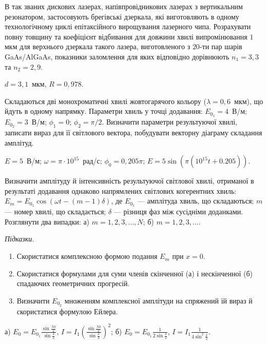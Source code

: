 \begin{problem}%
    В так званих дискових лазерах, напівпровідникових лазерах з вертикальним резонатором, застосовують брегівські дзеркала, які виготовляють в одному технологічному циклі епітаксійного вирощування лазерного чипа. Розрахувати повну товщину та коефіцієнт відбивання для довжини хвилі випромінювання $ 1 $ мкм для верхнього дзеркала такого лазера, виготовленого з $ 20 $-ти пар шарів GaAs/AlGaAs, показники заломлення для яких відповідно дорівнюють $ n_1= 3,3 $  та $ n_2=2,9 $.
\begin{solution}
    $ d =  3,1$~мкм, $ R=0,978 $.
\end{solution}
\end{problem}



\begin{problem}%
Складаються дві монохроматичні хвилі жовтогарячого кольору ($\lambda =
	0,6$~мкм), що йдуть в одному напрямку. Параметри хвиль у точці
додавання: $E_{0_1} = 4$~В/м; $E_{0_2} = 3$~В/м; $\phi_1 = 0$; $\phi_2 = \pi/2$. Визначити
параметри результуючої хвилі, записати вираз для її світлового вектора,
побудувати векторну діаграму складання амплітуд.
\begin{solution}
	$ E = 5 $~В/м; $\omega = \pi\cdot10^{15}$~рад/с; $\phi_0 = 0,205\pi$; $ E = 5\sin(\pi(10^{15} t + 0.205)) $.
\end{solution}
\end{problem}


\begin{problem}%
Визначити амплітуду й інтенсивність результуючої світлової хвилі,
отриманої в результаті додавання однаково напрямлених світлових
когерентних хвиль: $E_m = E_{0_1}\cos(\omega t - (m - 1) \delta)$, де $E_{0_1}$ --- амплітуда хвиль, що
складаються; $m$ --- номер хвилі, що складається; $\delta$ --- різниця фаз між
сусідніми доданками. Розглянути два випадки: а) $m = 1, 2, 3, \ldots, N$; б) $m =
	1, 2, 3, \ldots$.
\begin{solution}
	\emph{Підказки}.
	\begin{enumerate}
		\item  Скористатися комплексною формою подання $E_m$ при $x = 0$.
		\item  Скористатися формулами для суми членів скінченної (а) і нескінченної (б) спадаючих
		      геометричних прогресій.
		\item  Визначити $ E_{0_2} $ множенням комплексної амплітуди на спряжений їй вираз й
		      скористатися формулою Ейлера.
	\end{enumerate}
	а) $ E_0 = E_{0_1} \frac{\sin\frac{N\delta}{2}}{\sin\frac{\delta}{2}} $, $ I = I_1 \left( \frac{\sin\frac{N\delta}{2}}{\sin\frac{\delta}{2}}\right)^2 $; б) $ E_0 = E_{0_1} \frac1{2\sin\frac{\delta}{2}} $, $ I = I_1 \frac1{4\sin^2\frac{\delta}{2}} $.
\end{solution}
\end{problem}


